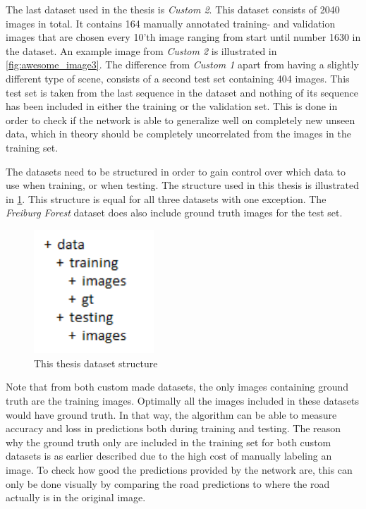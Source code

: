 \documentclass[USenglish]{ifimaster}  %
\begin{document}
The last dataset used in the thesis is \textit{Custom 2}. This dataset consists of 2040 images in total. It contains 164 manually annotated training- and validation images that are chosen every 10'th image ranging from start until number 1630 in the dataset. An example image from \textit{Custom 2} is illustrated in \cref{fig:awesome_image3}. The difference from \textit{Custom 1} apart from having a slightly different type of scene, consists of a second test set containing 404 images. This test set is taken from the last sequence in the dataset and nothing of its sequence has been included in either the training or the validation set. This is done in order to check if the network is able to generalize well on completely new unseen data, which in theory should be completely uncorrelated from the images in the training set.

The datasets need to be structured in order to gain control over which data to use when training, or when testing. The structure used in this thesis is illustrated in \cref{fig:dataset_structure}. This structure is equal for all three datasets with one exception. The \textit{Freiburg Forest} dataset does also include ground truth images for the test set.

\begin{figure}[ht]
    \centering
    \includegraphics[width=0.4\textwidth]{bilder/dataset_structure.PNG}
    \caption{This thesis dataset structure}
    \label{fig:dataset_structure}
\end{figure}

Note that from both custom made datasets, the only images containing ground truth are the training images. Optimally all the images included in these datasets would have ground truth. In that way, the algorithm can be able to measure accuracy and loss in predictions both during training and testing. The reason why the ground truth only are included in the training set for both custom datasets is as earlier described due to the high cost of manually labeling an image. To check how good the predictions provided by the network are, this can only be done visually by comparing the road predictions to where the road actually is in the original image.
\end{document}
